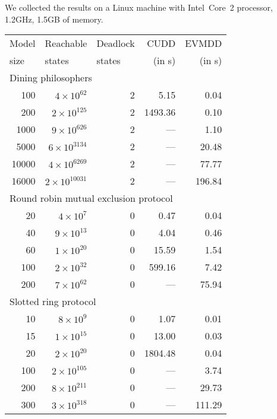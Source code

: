 \documentclass[a4paper,oneside,11pt,pdftex]{llncs}
\begin{document}
We collected the results on a Linux machine with Intel~Core~2 processor, 1.2GHz, 1.5GB of memory.
\begin{table}[htb]
  \begin{center}
    \begin{tabular}{|r||r|r||r|r|}
      \hline
      \multicolumn{1}{|l||}{Model} & \multicolumn{1}{l|}{Reachable} & \multicolumn{1}{|l||}{Deadlock} & CUDD & EVMDD \\
      \multicolumn{1}{|l||}{size}  & \multicolumn{1}{l|}{states} & \multicolumn{1}{|l||}{states} & (in s) & (in s) \\
      \hline
      \multicolumn{5}{|l|}{Dining philosophers}\\
      \hline
      100 & $4\times10^{62}$ & 2 &    5.15 &    0.04 \\
      200 & $2\times10^{125}$ & 2 & 1493.36 &    0.10 \\
      1000 & $9\times10^{626}$ & 2 &   --- &    1.10 \\
      5000 & $6\times10^{3134}$ & 2 &   --- &   20.48 \\
      10000 & $4\times10^{6269}$ & 2 &   --- &   77.77 \\
      16000 & $2\times10^{10031}$ & 2 &   --- &  196.84 \\
      \hline
      \multicolumn{5}{|l|}{Round robin mutual exclusion protocol}\\
      \hline
      20 & $4\times10^{7}$ & 0 &    0.47 &    0.04 \\
      40 & $9\times10^{13}$ & 0 &    4.04 &    0.46 \\
      60 & $1\times10^{20}$ & 0 &   15.59 &    1.54 \\
      100 & $2\times10^{32}$ & 0 &  599.16 &    7.42 \\
      200 & $7\times10^{62}$ & 0 &   --- &   75.94 \\
      \hline
      \multicolumn{5}{|l|}{Slotted ring protocol}\\
      \hline
      10 & $8\times10^{9}$ & 0 &    1.07 &    0.01 \\
      15 & $1\times10^{15}$ & 0 &   13.00 &    0.03 \\
      20 & $2\times10^{20}$ & 0 & 1804.48 &    0.04 \\
      100 & $2\times10^{105}$ & 0 &   --- &    3.74 \\
      200 & $8\times10^{211}$ & 0 &   --- &   29.73 \\
      300 & $3\times10^{318}$ & 0 &   --- &  111.29 \\

\end{tabular}
\end{center}
\end{table}
\end{document}
